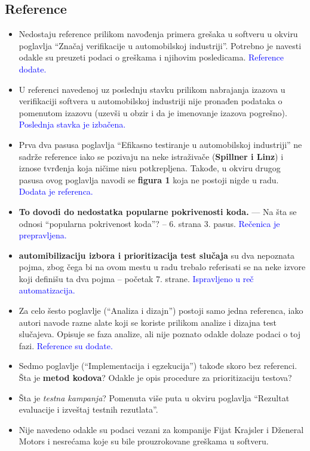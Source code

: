 \documentclass[a4paper]{report}
\newcommand{\odgovor}[1]{\textcolor{blue}{#1}}
\begin{document}
\subsection{Reference}
\begin{itemize}
\item Nedostaju reference prilikom navođenja primera grešaka u softveru u okviru poglavlja ``Značaj verifikacije u automobilskoj industriji''. Potrebno je navesti odakle su preuzeti podaci o greškama i njihovim posledicama. \odgovor{Reference dodate.}
\item U referenci navedenoj uz poslednju stavku prilikom nabrajanja izazova u verifikaciji softvera u automobilskoj industriji nije pronađen podataka o pomenutom izazovu (uzevši u obzir i da je imenovanje izazova pogrešno). \odgovor{Poslednja stavka je izbačena.}
\item Prva dva pasusa poglavlja ``Efikasno testiranje u automobilskoj industriji'' ne sadrže reference iako se pozivaju na neke istraživače ({\bf{Spillner i Linz}}) i iznose tvrđenja koja ničime nisu potkrepljena. Takođe, u okviru drugog pasusa ovog poglavlja navodi se {\bf{figura 1}} koja ne postoji nigde u radu. \odgovor{Dodata je referenca.}
\item {\bf{To dovodi do nedostatka popularne pokrivenosti koda.}} --- Na šta se odnosi ``popularna pokrivenost koda''? -- 6. strana 3. pasus. \odgovor{Rečenica je prepravljena.}
\item {\bf{automibilizaciju izbora i prioritizacija test slučaja}} su dva nepoznata pojma, zbog čega bi na ovom mestu u radu trebalo referisati se na neke izvore koji definišu ta dva pojma -- početak 7. strane. \odgovor{Ispravljeno u reč automatizacija.}
\item Za celo šesto poglavlje (``Analiza i dizajn'') postoji samo jedna referenca, iako autori navode razne alate koji se koriste prilikom analize i dizajna test slučajeva. Opisuje se faza analize, ali nije poznato odakle dolaze podaci o toj fazi. \odgovor{Reference su dodate.}
\item Sedmo poglavlje (``Implementacija i egzekucija'') takođe skoro bez referenci. Šta je {\bf{metod kodova}}? Odakle je opis procedure za prioritizaciju testova?
\item Šta je {\em{testna kampanja}}? Pomenuta više puta u okviru poglavlja ``Rezultat evaluacije i izveštaj testnih rezutlata''.
\item Nije navedeno odakle su podaci vezani za kompanije Fijat Krajsler i Dženeral Motors i nesrećama koje su bile prouzrokovane greškama u softveru.
\end{itemize}
\end{document}
